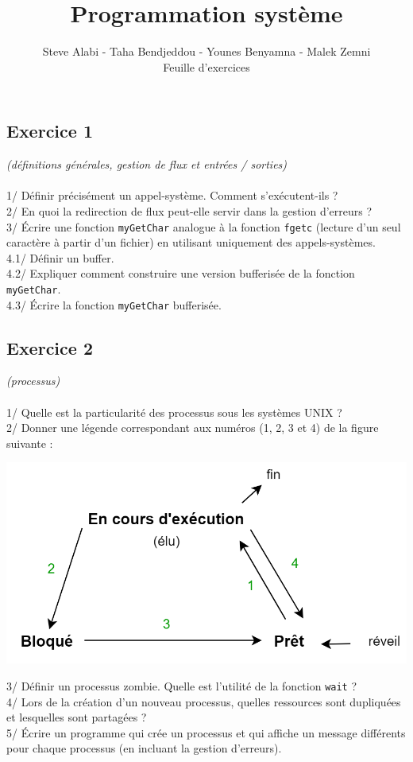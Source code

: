 \documentclass[a4paper,12pt]{article}
\title{\textbf{Programmation système}}
\author{
	Steve Alabi - Taha Bendjeddou - Younes Benyamna - Malek Zemni
	\vspace{1em}\\
	Feuille d'exercices
	\vspace{0.5em}
}
\begin{document}
\maketitle

	\subsection*{Exercice 1} 
	\textit{(définitions générales, gestion de flux et entrées / sorties)}
	\\~\\
	1/ Définir précisément un appel-système. Comment s'exécutent-ils ?\\ 
	2/ En quoi la redirection de flux peut-elle servir dans la gestion d'erreurs ? \\
	3/ Écrire une fonction \lstinline!myGetChar! analogue à la fonction \lstinline!fgetc! (lecture d'un seul caractère à partir d'un fichier) en utilisant uniquement des appels-systèmes.\\
	4.1/ Définir un buffer. \\
	4.2/ Expliquer comment construire une version bufferisée de la fonction \lstinline!myGetChar!.\\
	4.3/ Écrire la fonction \lstinline!myGetChar! bufferisée.
	
	\subsection*{Exercice 2} 
	\textit{(processus)}
	\\~\\
	1/ Quelle est la particularité des processus sous les systèmes UNIX ?\\
	2/ Donner une légende correspondant aux numéros (1, 2, 3 et 4) de la figure suivante :
	\begin{center}\includegraphics[scale=0.4]{../img/process.png}\end{center}
	3/ Définir un processus zombie. Quelle est l'utilité de la fonction \lstinline!wait! ?\\
	4/ Lors de la création d'un nouveau processus, quelles ressources sont dupliquées et lesquelles sont partagées ?\\
	5/ Écrire un programme qui crée un processus et qui affiche un message différents pour chaque processus (en incluant la gestion d'erreurs). 
	
\end{document}
